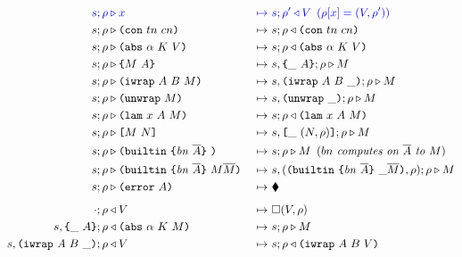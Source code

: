 \documentclass[../plutus-core-specification.tex]{subfiles}
\begin{document}
\begin{figure}[!ht]
  \ContinuedFloat
\hspace*{-1cm}\begin{subfigure}[c]{\linewidth}  %
    \begin{alignat*}{2}
      \blue{s; \rho} & \bcompute \blue{x}          &~\bmapsto~&\blue{s;\rho^{\prime} \return V \enspace (\rho[x] = (V,\rho^{\prime}))} \\
       s; \rho &\compute \con{tn}{cn}             &~\mapsto~& s;\rho \return \con{tn}{cn}\\
       s; \rho &\compute \abs{\alpha}{K}{V}       &~\mapsto~& s;\rho \return \abs{\alpha}{K}{V}\\
       s; \rho &\compute \inst{M}{A}              &~\mapsto~& s,\inInstLeftFrame{A};\rho \compute M\\
       s; \rho &\compute \wrap{A}{B}{M}           &~\mapsto~& s,\inWrapRightFrame{A}{B};\rho  \compute M\\ 
       s; \rho &\compute \unwrap{M}               &~\mapsto~& s,\inUnwrapFrame{};\rho  \compute M\\
       s; \rho &\compute \lam{x}{A}{M}            &~\mapsto~& s;\rho \return \lam{x}{A}{M}\\
       s; \rho &\compute \app{M}{N}               &~\mapsto~& s,\inAppLeftFrame{(N,\rho)};\rho \compute M\\
       s; \rho &\compute \builtin{bn}{\repetition{A}}{} &~\mapsto~& s;\rho \compute M \enspace (\textit{$bn$ computes on $\repetition{A}$ to $M$})\\
       s; \rho &\compute \builtin{bn}{\repetition{A}}{M \repetition{M}} &~\mapsto~& s,(\inBuiltin{bn}{\repetition{A}}{}{\_}{\repetition{M}}, \rho);\rho \compute M\\
       s; \rho &\compute \error{A}                &~\mapsto~& \ckerror{}\\
  \\[-10pt] %
       \cdot; \rho &\return V                     &~\mapsto~& \square (V, \rho)\\
       s,\inInstLeftFrame{A}; \rho                &\return \abs{\alpha}{K}{M} &~\mapsto~& s;\rho \compute{M} \\
       s,\inWrapRightFrame{A}{B}; \rho            &\return V &~\mapsto~& s;\rho \return \wrap{A}{B}{V}\\

\end{alignat*}
\end{subfigure}
\end{figure}
\end{document}
